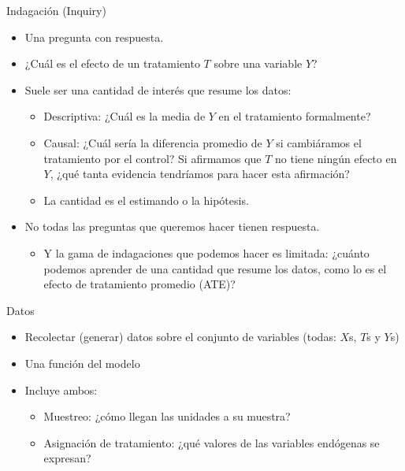 \documentclass[
  ignorenonframetext,
]{beamer}
\providecommand{\tightlist}{%
  \setlength{\itemsep}{0pt}\setlength{\parskip}{0pt}}
\begin{document}
\begin{frame}{Indagación (Inquiry)}
\protect\hypertarget{indagaciuxf3n-inquiry}{}
\begin{itemize}
\item
  Una pregunta con respuesta.
\item
  ¿Cuál es el efecto de un tratamiento \(T\) sobre una variable \(Y\)?
\item
  Suele ser una cantidad de interés que resume los datos:

  \begin{itemize}
  \item
    Descriptiva: ¿Cuál es la media de \(Y\) en el tratamiento
    formalmente?
  \item
    Causal: ¿Cuál sería la diferencia promedio de \(Y\) si cambiáramos
    el tratamiento por el control? Si afirmamos que \(T\) no tiene
    ningún efecto en \(Y\), ¿qué tanta evidencia tendríamos para hacer
    esta afirmación?
  \item
    La cantidad es el estimando o la hipótesis.
  \end{itemize}
\item
  No todas las preguntas que queremos hacer tienen respuesta.

  \begin{itemize}
  \tightlist
  \item
    Y la gama de indagaciones que podemos hacer es limitada: ¿cuánto
    podemos aprender de una cantidad que resume los datos, como lo es el
    efecto de tratamiento promedio (ATE)?
  \end{itemize}
\end{itemize}
\end{frame}

\begin{frame}{Datos}
\protect\hypertarget{datos}{}
\begin{itemize}
\item
  Recolectar (generar) datos sobre el conjunto de variables (todas:
  \(X\)s, \(T\)s y \(Y\)s)
\item
  Una función del modelo
\item
  Incluye ambos:

  \begin{itemize}
  \item
    Muestreo: ¿cómo llegan las unidades a su muestra?
  \item
    Asignación de tratamiento: ¿qué valores de las variables endógenas
    se expresan?
  \end{itemize}
\end{itemize}
\end{frame}
\end{document}
